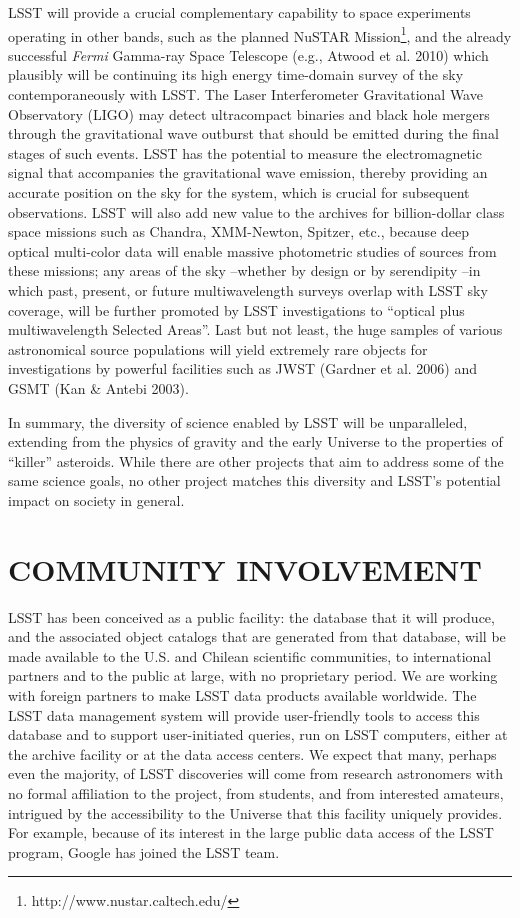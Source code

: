 \documentclass{emulateapj}
\begin{document}
LSST will provide a crucial complementary capability to space 
experiments operating in other bands, such as the planned 
NuSTAR Mission\footnote{http://www.nustar.caltech.edu/}, and the already successful {\it Fermi} 
Gamma-ray Space Telescope (e.g., Atwood et al. 2010) which plausibly will be continuing its high 
energy time-domain survey of the sky contemporaneously with LSST. 
The Laser Interferometer Gravitational 
Wave Observatory (LIGO) may detect ultracompact binaries and black hole mergers through the 
gravitational wave outburst that should be emitted during the final stages of such events. 
LSST has the potential to measure the electromagnetic signal that accompanies the gravitational wave emission, 
thereby providing an accurate position on the sky for the system, which is 
crucial for subsequent observations. LSST will also add new value to the archives for 
billion-dollar class space missions such as Chandra, XMM-Newton, Spitzer,
etc., because deep optical multi-color data will enable 
massive photometric  studies of sources from these missions;
any areas of the sky --whether by design or by serendipity --in which past, present, or future 
multiwavelength surveys overlap with LSST sky coverage, will be further promoted by LSST 
investigations to ``optical plus multiwavelength Selected Areas''.   
Last but not least, the huge samples of various astronomical source
populations will yield extremely rare objects for investigations by powerful
facilities such as JWST (Gardner et al. 2006) and GSMT (Kan \& Antebi 2003).

In summary, the diversity of science enabled by LSST will be 
unparalleled, extending from the physics of gravity and the
early Universe to the properties of ``killer'' asteroids. While
there are other projects that aim to address some of the same
science goals, no other project matches this diversity and 
LSST's potential impact on society in general. 


\section{   COMMUNITY INVOLVEMENT   }
\label{Sec:community}

LSST has been conceived as a public facility: the database that it will
produce, and the associated object catalogs that are generated from that
database, will be made available to the U.S. and Chilean scientific communities,
to international partners and to the public at large, with no proprietary period. 
We are working with foreign partners 
to make LSST data products available worldwide. The LSST data management 
system will provide user-friendly tools to access this database and to support
user-initiated queries, run on LSST computers, either at the archive facility 
or at the data access centers. We expect that many, perhaps even the majority,
of LSST discoveries will come from research astronomers with no formal
affiliation to the project, from students, and from interested amateurs, 
intrigued by the accessibility to the Universe that this facility uniquely 
provides. For example, because of its interest in the large public data access 
of the LSST program, Google has joined the LSST team. 
\end{document}
